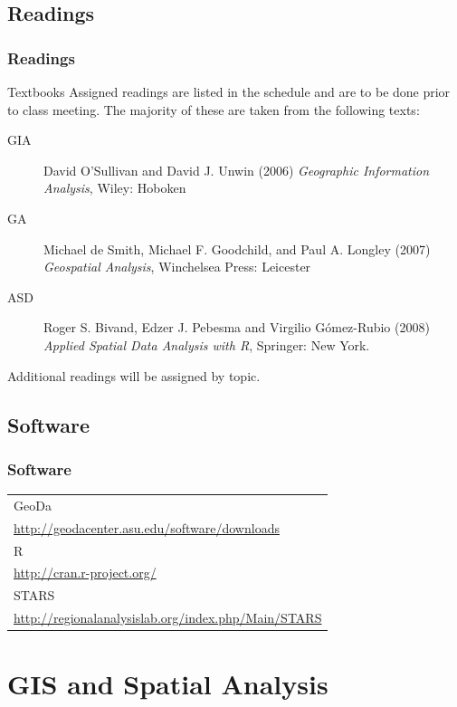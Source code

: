 \documentclass[nototal,handout]{beamer}
\begin{document}
\subsection{Readings} 

\begin{frame}
\frametitle{Readings}
\begin{block}{Textbooks}
Assigned readings are listed in the schedule and are to be
done prior to class meeting. The majority of these are taken from the
following texts:
\begin{description}
  \item[GIA] David O'Sullivan and
David J. Unwin (2006) \emph{Geographic Information Analysis}, Wiley: Hoboken
  \item[GA] 
Michael de Smith, Michael F. Goodchild, and Paul A. Longley (2007) \emph{Geospatial
Analysis}, Winchelsea Press: Leicester\\
\item[ASD] Roger S. Bivand, Edzer J. Pebesma and Virgilio G\'omez-Rubio (2008)
  \emph{Applied Spatial Data Analysis with R}, Springer: New York.
\end{description}

Additional readings will be assigned by topic.


\end{block}

\end{frame}

\subsection{Software} 

\begin{frame}
	\frametitle{Software}
  \centering
 \begin{tabular}{l}
  GeoDa\\
    \url{http://geodacenter.asu.edu/software/downloads}
    \\ \hline
   R\\
    \url{http://cran.r-project.org/}
    \\
    \hline
   STARS
   \\
    \url{http://regionalanalysislab.org/index.php/Main/STARS}	
    \\
    \hline
 \end{tabular}
 \end{frame} 


\section{GIS and Spatial Analysis} 
\end{document}
